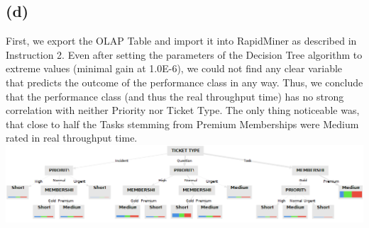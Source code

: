 \documentclass[../../main.tex]{subfiles}
\begin{document}
\subsection*{(d)}
First, we export the OLAP Table and import it into RapidMiner as described in Instruction 2. Even after setting the parameters of the Decision Tree algorithm to extreme values (minimal gain at 1.0E-6), we could not find any clear variable that predicts the outcome of the performance class in any way. Thus, we conclude that the performance class (and thus the real throughput time) has no strong correlation with neither Priority nor Ticket Type. The only thing noticeable was, that close to half the Tasks stemming from Premium Memberships were Medium rated in real throughput time.\\
\includegraphics[width=\columnwidth]{img/Celonis_d_Decision_Tree.png}
\end{document}
